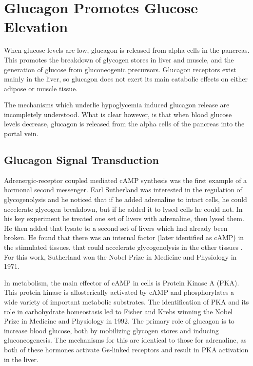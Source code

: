 \documentclass{tufte-handout}
\begin{document}
\section{Glucagon Promotes Glucose Elevation}

 When glucose levels are low, glucagon is released from alpha cells in the pancreas.  This promotes the breakdown of glycogen stores in liver and muscle, and the generation of glucose from gluconeogenic precursors.  Glucagon receptors exist mainly in the liver, so glucagon does not exert its main catabolic effects on either adipose or muscle tissue. 

The mechanisms which underlie hypoglycemia induced glucagon release are incompletely understood.  What is clear however, is that when blood glucose levels decrease, glucagon is released from the alpha cells of the pancreas into the portal vein.

\subsection{Glucagon Signal Transduction}

Adrenergic-receptor coupled mediated cAMP synthesis was the first example of a hormonal second messenger.  Earl Sutherland was interested in the regulation of glycogenolysis and he noticed that if he added adrenaline to intact cells, he could accelerate glycogen breakdown, but if he added it to lysed cells he could not.  In his key experiment he treated one set of livers with adrenaline, then lysed them.  He then added that lysate to a second set of livers which had already been broken.  He found that there was an internal factor (later identified as cAMP) in the stimulated tissues, that could accelerate glycogenolysis in the other tissues \cite{Rall1956}.  For this work, Sutherland won the Nobel Prize in Medicine and Physiology in 1971.

In metabolism, the main effector of cAMP in cells is Protein Kinase A (PKA).  This protein kinase is allosterically activated by cAMP and phosphorylates a wide variety of important metabolic substrates.  The identification of PKA and its role in carbohydrate homeostasis led to Fisher and Krebs winning the Nobel Prize in Medicine and Physiology in 1992.  The primary role of glucagon is to increase blood glucose, both by mobilizing glycogen stores and inducing gluconeogenesis.  The mechanisms for this are identical to those for adrenaline, as both of these hormones activate Gs-linked receptors and result in PKA activation in the liver.
\end{document}
